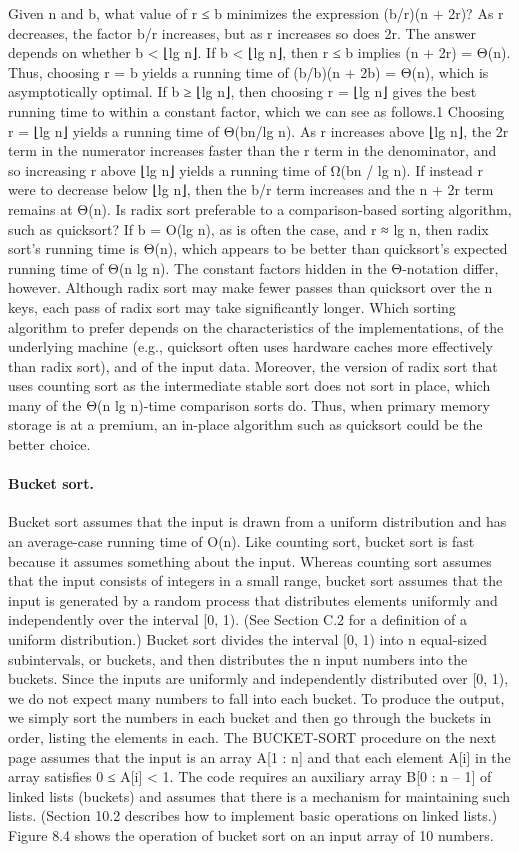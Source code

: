 Given n and b, what value of r ≤ b minimizes the expression (b/r)(n + 2r)? As r decreases, the factor b/r increases, but as r increases so does 2r. The answer depends on whether b < ⌊lg n⌋. If b < ⌊lg n⌋, then r ≤ b implies (n + 2r) = Θ(n). Thus, choosing r = b yields a running time of (b/b)(n + 2b) = Θ(n), which is asymptotically optimal. If b ≥ ⌊lg n⌋, then choosing r = ⌊lg n⌋ gives the best running time to within a constant factor, which we can see as follows.1 Choosing r = ⌊lg n⌋ yields a running time of Θ(bn/lg n). As r increases above ⌊lg n⌋, the 2r term in the numerator increases faster than the r term in the denominator, and so increasing r above ⌊lg n⌋ yields a running time of Ω(bn / lg n). If instead r were to decrease below ⌊lg n⌋, then the b/r term increases and the n + 2r term remains at Θ(n).
Is radix sort preferable to a comparison-based sorting algorithm, such as quicksort? If b = O(lg n), as is often the case, and r ≈ lg n, then radix sort’s running time is Θ(n), which appears to be better than quicksort’s expected running time of Θ(n lg n). The constant factors hidden in the Θ-notation differ, however. Although radix sort may make fewer passes than quicksort over the n keys, each pass of radix sort may take significantly longer. Which sorting algorithm to prefer depends on the characteristics of the implementations, of the underlying machine (e.g., quicksort often uses hardware caches more effectively than radix sort), and of the input data. Moreover, the version of radix sort that uses counting sort as the intermediate stable sort does not sort in place, which many of the Θ(n lg n)-time comparison sorts do. Thus, when primary memory storage is at a premium, an in-place algorithm such as quicksort could be the better choice.


\paragraph{Bucket sort.}
Bucket sort assumes that the input is drawn from a uniform distribution and has an average-case running time of O(n). Like counting sort, bucket sort is fast because it assumes something about the input. Whereas counting sort assumes that the input consists of integers in a small range, bucket sort assumes that the input is generated by a random process that distributes elements uniformly and independently over the interval [0, 1). (See Section C.2 for a definition of a uniform distribution.)
Bucket sort divides the interval [0, 1) into n equal-sized subintervals, or buckets, and then distributes the n input numbers into the buckets. Since the inputs are uniformly and independently distributed over [0, 1), we do not expect many numbers to fall into each bucket. To produce the output, we simply sort the numbers in each bucket and then go through the buckets in order, listing the elements in each.
The BUCKET-SORT procedure on the next page assumes that the input is an array A[1 : n] and that each element A[i] in the array satisfies 0 ≤ A[i] < 1. The code requires an auxiliary array B[0 : n – 1] of linked lists (buckets) and assumes that there is a mechanism for maintaining such lists. (Section 10.2 describes how to implement basic operations on linked lists.) Figure 8.4 shows the operation of bucket sort on an input array of 10 numbers.

